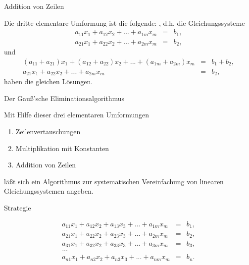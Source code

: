 \documentclass[german]{beamer}
\newcommand{\bq}{\begin{eqnarray*}}
\newcommand{\eq}{\end{eqnarray*}}
\newcommand{\superalert}[1]{{\color{MyYellowOrange}{#1}}}
\begin{document}
\begin{frame}{Addition von Zeilen}

Die dritte elementare Umformung ist die folgende: 
\superalert{Man darf eine Zeile durch die Summe dieser Zeile mit einer anderen Zeile 
ersetzen}, d.h. die Gleichungssysteme
\bq
 a_{11} x_1 + a_{12} x_2 + ... + a_{1m} x_m & = & b_1,
\nonumber \\
 a_{21} x_1 + a_{22} x_2 + ... + a_{2m} x_m & = & b_2,
\eq
und
\bq
 \left( a_{11} + a_{21} \right) x_1 + \left( a_{12} + a_{22} \right) x_2 + ... + \left( a_{1m} + a_{2m} \right) x_m & = & b_1 + b_2,
\nonumber \\
 a_{21} x_1 + a_{22} x_2 + ... + a_{2m} x_m & = & b_2,
\eq
haben die gleichen L\"osungen.

\end{frame}

\begin{frame}{Der Gau{\ss}'sche Eliminationsalgorithmus}

Mit Hilfe dieser drei elementaren Umformungen 
\begin{enumerate}
\item Zeilenvertauschungen
\item Multiplikation mit Konstanten
\item Addition von Zeilen
\end{enumerate}
l\"a{\ss}t sich ein Algorithmus zur systematischen Vereinfachung von 
linearen Gleichungssystemen angeben.

\end{frame}

\begin{frame}{Strategie}

\bq
 a_{11} x_1 + a_{12} x_2 + a_{13} x_3 + ... + a_{1m} x_m & = & b_1,
\nonumber \\
 a_{21} x_1 + a_{22} x_2 + a_{23} x_3 + ... + a_{2m} x_m & = & b_2,
\nonumber \\
 a_{31} x_1 + a_{32} x_2 + a_{33} x_3 + ... + a_{3m} x_m & = & b_3,
\nonumber \\
 ... & & 
\nonumber \\
 a_{n1} x_1 + a_{n2} x_2 + a_{n3} x_3 + ... + a_{nm} x_m & = & b_n.
\eq

\end{frame}
\end{document}
